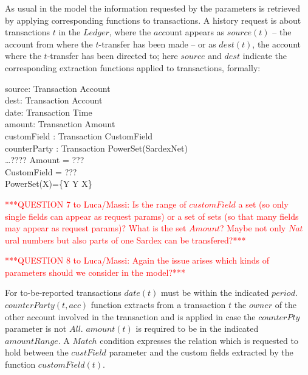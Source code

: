 As usual in the model the information requested by the parameters is retrieved by applying corresponding functions to transactions. A  history request is about transactions $t$ in the $Ledger$, where the $acc$ount appears as $source(t)$ -- the account from where the $t$-transfer has been made -- or as $dest(t)$, the account where the $t$-transfer has been directed to; here $source$ and $dest$ 
indicate the corresponding extraction functions applied to transactions, formally:

\begin{asm}
source: Transaction \rightarrow Account \\
dest: Transaction \rightarrow Account\\
date: Transaction \rightarrow Time\\
amount: Transaction \rightarrow Amount \\
customField : Transaction \rightarrow CustomField \\
counterParty : Transaction \rightarrow PowerSet(SardexNet) \\
\ldots ???? \+
\WHERE \+
Amount = ??? \\
CustomField = ???\\
PowerSet(X)=\{Y \mid Y \subseteq X\}
\end{asm}

\vspace{12pt}
\textcolor{red}{***QUESTION 7 to Luca/Massi: Is the range of $customField$ a set (so only single fields can appear as request params) or a set of sets (so that many fields may appear as request params)? What is the set $Amount$? Maybe not only $Nat$ural numbers but also parts of one Sardex can be transfered?***}\vspace{12pt}

\vspace{12pt}
\textcolor{red}{***QUESTION 8 to Luca/Massi: Again the issue arises which kinds of parameters should we consider in the model?***}\vspace{12pt}

For to-be-reported transactions $date(t)$ must be within the indicated $period$.  $counterParty(t, acc)$ function extracts from a transaction $t$ the $owner$ of the other account involved in the transaction and is applied in case the $counterPty$ parameter is not $All$.  $amount(t)$  is required to be in the indicated $amountRange$. A $Match$ condition expresses the relation which is requested to hold between the $custField$ parameter and the custom fields extracted by the function $customField(t)$. 

